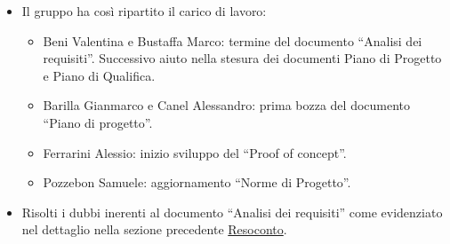 \begin{itemize}
	\item Il gruppo ha così ripartito il carico di lavoro:
	\begin{itemize}
		\item Beni Valentina e Bustaffa Marco: termine del documento ``Analisi dei requisiti''. Successivo aiuto nella stesura dei documenti Piano di Progetto e Piano di Qualifica. 
		\item Barilla Gianmarco e Canel Alessandro: prima bozza del documento ``Piano di progetto''.
		\item Ferrarini Alessio: inizio sviluppo del ``Proof of concept''.
		\item Pozzebon Samuele: aggiornamento ``Norme di Progetto''.
	\end{itemize}
	\item Risolti i dubbi inerenti al documento ``Analisi dei requisiti'' come evidenziato nel dettaglio nella sezione precedente \hyperref[sec:Resoconto]{Resoconto}.
\end{itemize}